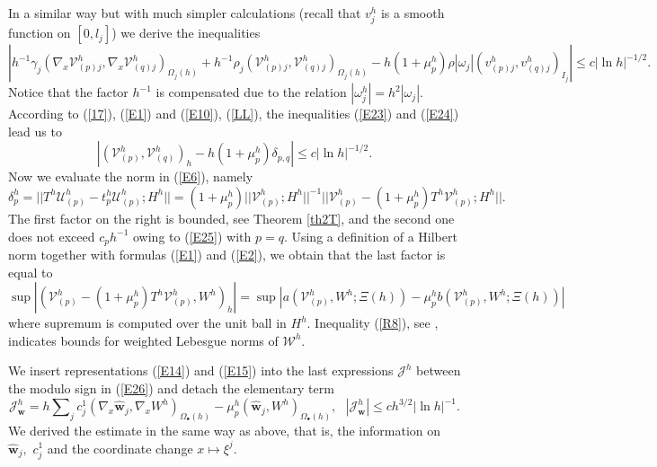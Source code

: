 \documentclass[11pt]{article}%
\numberwithin{equation}{section}
\begin{document}
In a similar way but with much simpler calculations (recall that $v_{j}^{h}$
is a smooth function on $[0,l_{j}]$) we derive the inequalities%
\begin{equation}
\left\vert h^{-1}\gamma_{j}(\nabla_{x}\mathcal{V}_{(p)j}^{h},\nabla
_{x}\mathcal{V}_{(q)j}^{h})_{\Omega_{j}(h)}+h^{-1}\rho_{j}(\mathcal{V}%
_{(p)j}^{h},\mathcal{V}_{(q)j}^{h})_{\Omega_{j}(h)}-h(1+\mu_{p}^{h}%
)\rho|\omega_{j}|(v_{(p)j}^{h},v_{(q)j}^{h})_{I_{j}}\right\vert \leq c|\ln
h|^{-1/2}. \label{E24}%
\end{equation}
Notice that the factor $h^{-1}$ is compensated due to the relation
$|\omega_{j}^{h}|=h^{2}|\omega_{j}|$. According to (\ref{17}), (\ref{E1}) and
(\ref{E10}), (\ref{LL}), the inequalities (\ref{E23}) and (\ref{E24}) lead us
to%
\begin{equation}
|(\mathcal{V}_{(p)}^{h},\mathcal{V}_{(q)}^{h})_{h}-h(1+\mu_{p}^{h}%
)\delta_{p,q}|\leq c|\ln h|^{-1/2}. \label{E25}%
\end{equation}
Now we evaluate the norm in (\ref{E6}), namely%
\begin{equation}
\delta_{p}^{h}=||T^{h}\mathcal{U}_{(p)}^{h}-t_{p}^{h}\mathcal{U}_{(p)}%
^{h};H^{h}||=(1+\mu_{p}^{h})||\mathcal{V}_{(p)}^{h};H^{h}||^{-1}%
||\mathcal{V}_{(p)}^{h}-(1+\mu_{p}^{h})T^{h}\mathcal{V}_{(p)}^{h};H^{h}||.
\label{dhp}%
\end{equation}
The first factor on the right is bounded, see Theorem \ref{th2T}, and the
second one does not exceed $c_{p}h^{-1}$ owing to (\ref{E25}) with $p=q$.
Using a definition of a Hilbert norm together with formulas (\ref{E1}) and
(\ref{E2}), we obtain that the last factor is equal to%
\begin{equation}
\sup\left\vert (\mathcal{V}_{(p)}^{h}-(1+\mu_{p}^{h})T^{h}\mathcal{V}%
_{(p)}^{h},W^{h})_{h}\right\vert =\sup\left\vert a(\mathcal{V}_{(p)}^{h}%
,W^{h};\Xi(h))-\mu_{p}^{h}b(\mathcal{V}_{(p)}^{h},W^{h};\Xi(h))\right\vert
\label{E26}%
\end{equation}
where supremum is computed over the unit ball in $H^{h}$. Inequality
(\ref{R8}), see \cite[Thm. 9]{BuCaNa1}, indicates bounds for weighted Lebesgue
norms of $\mathcal{W}^{h}$.

We insert representations (\ref{E14}) and (\ref{E15}) into the last
expressions $\mathcal{J}^{h}$ between the modulo sign in (\ref{E26}) and
detach the elementary term%
\begin{equation}
\mathcal{J}_{\mathbf{w}}^{h}=h%
{\textstyle\sum\nolimits_{j}}
c_{j}^{1}(\nabla_{x}\widehat{\mathbf{w}}_{j},\nabla_{x}W^{h})_{\Omega
_{\bullet}(h)}-\mu_{p}^{h}(\widehat{\mathbf{w}}_{j},W^{h})_{\Omega_{\bullet
}(h)},\ \ \ |\mathcal{J}_{\mathbf{w}}^{h}|\leq ch^{3/2}|\ln h|^{-1}.
\label{E27}%
\end{equation}
We derived the estimate in the same way as above, that is, the information on
$\widehat{\mathbf{w}}_{j},$ $c_{j}^{1}$ and the coordinate change $x\mapsto
\xi^{j}$.
\end{document}
